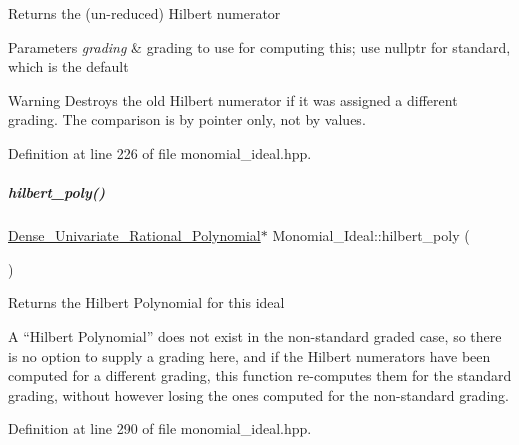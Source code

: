 \begin{DoxyReturn}{Returns}
the (un-\/reduced) Hilbert numerator 
\end{DoxyReturn}

\begin{DoxyParams}{Parameters}
{\em grading} & grading to use for computing this; use {\ttfamily nullptr} for standard, which is the default \\
\hline
\end{DoxyParams}
\begin{DoxyWarning}{Warning}
Destroys the old Hilbert numerator if it was assigned a different grading. The comparison is by pointer only, not by values. 
\end{DoxyWarning}


Definition at line 226 of file monomial\+\_\+ideal.\+hpp.

\mbox{\label{group__polygroup_a2f5e73c22e492ea016a4c7ff117cc7a3}} 
\subparagraph{\texorpdfstring{hilbert\+\_\+poly()}{hilbert\_poly()}}
{\footnotesize\ttfamily \hyperlink{group__polygroup_class_dense___univariate___rational___polynomial}{Dense\+\_\+\+Univariate\+\_\+\+Rational\+\_\+\+Polynomial}$\ast$ Monomial\+\_\+\+Ideal\+::hilbert\+\_\+poly (\begin{DoxyParamCaption}{ }\end{DoxyParamCaption})\hspace{0.3cm}{\ttfamily [inline]}}

\begin{DoxyReturn}{Returns}
the Hilbert Polynomial for this ideal
\end{DoxyReturn}
A ``Hilbert Polynomial'' does not exist in the non-\/standard graded case, so there is no option to supply a grading here, and if the Hilbert numerators have been computed for a different grading, this function re-\/computes them for the standard grading, without however losing the ones computed for the non-\/standard grading. 

Definition at line 290 of file monomial\+\_\+ideal.\+hpp.

